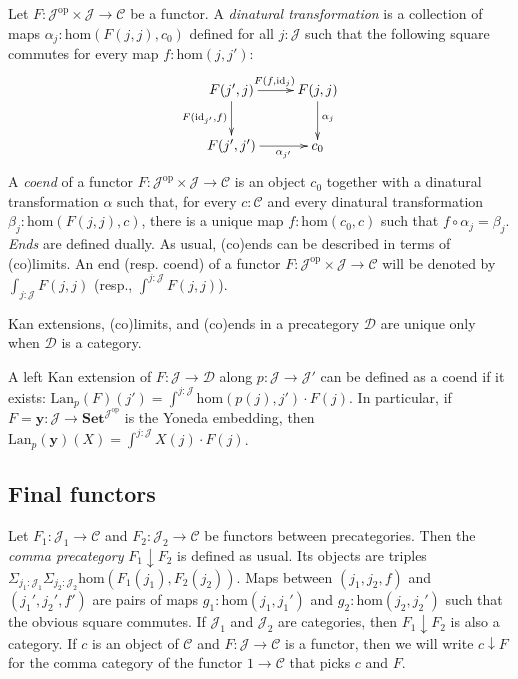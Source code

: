 \documentclass[reqno]{amsart}
\theoremstyle{definition}
\theoremstyle{remark}
\newcommand{\fs}[1]{\mathrm{#1}}
\newcommand{\cat}[1]{\mathbf{#1}}
\newcommand{\scat}[1]{\mathcal{#1}}
\renewcommand{\hom}{\fs{hom}}
\newcommand{\id}{\fs{id}}
\newcommand{\Set}{\cat{Set}}
\numberwithin{figure}{section}
\begin{document}
Let $F : \scat{J}^\fs{op} \times \scat{J} \to \scat{C}$ be a functor.
A \emph{dinatural transformation} is a collection of maps $\alpha_j : \hom(F(j,j),c_0)$ defined for all $j : \scat{J}$ such that the following square commutes for every map $f : \hom(j,j')$:
\[ \xymatrix{ F(j',j) \ar[r]^{F(f,\id_j)} \ar[d]_{F(\id_{j'},f)}    & F(j,j) \ar[d]^{\alpha_j} \\
              F(j',j') \ar[r]_-{\alpha_{j'}}                        & c_0
            } \]
A \emph{coend} of a functor $F : \scat{J}^\fs{op} \times \scat{J} \to \scat{C}$ is an object $c_0$ together with a dinatural transformation $\alpha$ such that,
for every $c : \scat{C}$ and every dinatural transformation $\beta_j : \hom(F(j,j),c)$, there is a unique map $f : \hom(c_0,c)$ such that $f \circ \alpha_j = \beta_j$.
\emph{Ends} are defined dually.
As usual, (co)ends can be described in terms of (co)limits.
An end (resp. coend) of a functor $F : \scat{J}^\fs{op} \times \scat{J} \to \scat{C}$ will be denoted by $\int_{j : \scat{J}} F(j,j)$ (resp., $\int^{j : \scat{J}} F(j,j)$).

\begin{remark}
Kan extensions, (co)limits, and (co)ends in a precategory $\scat{D}$ are unique only when $\scat{D}$ is a category.
\end{remark}

A left Kan extension of $F : \scat{J} \to \scat{D}$ along $p : \scat{J} \to \scat{J}'$ can be defined as a coend if it exists: $\fs{Lan}_p(F)(j') = \int^{j : \scat{J}} \hom(p(j),j') \cdot F(j)$.
In particular, if $F = \cat{y} : \scat{J} \to \Set^{\scat{J}^\fs{op}}$ is the Yoneda embedding, then $\fs{Lan}_p(\cat{y})(X) = \int^{j : \scat{J}} X(j) \cdot F(j)$.

\subsection{Final functors}

Let $F_1 : \scat{J}_1 \to \scat{C}$ and $F_2 : \scat{J}_2 \to \scat{C}$ be functors between precategories.
Then the \emph{comma precategory} $F_1 \downarrow F_2$ is defined as usual.
Its objects are triples $\Sigma_{j_1 : \scat{J}_1} \Sigma_{j_2 : \scat{J}_2} \hom(F_1(j_1),F_2(j_2))$.
Maps between $(j_1,j_2,f)$ and $(j_1',j_2',f')$ are pairs of maps $g_1 : \hom(j_1,j_1')$ and $g_2 : \hom(j_2,j_2')$ such that the obvious square commutes.
If $\scat{J}_1$ and $\scat{J}_2$ are categories, then $F_1 \downarrow F_2$ is also a category.
If $c$ is an object of $\scat{C}$ and $F : \scat{J} \to \scat{C}$ is a functor, then we will write $c \downarrow F$ for the comma category of the functor $1 \to \scat{C}$ that picks $c$ and $F$.
\end{document}
